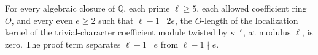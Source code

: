 
\begin{formalstatement}\label{sub:W15}
For every algebraic closure of $\mathbb Q$, each prime $\ell\ge5$,
each allowed coefficient ring $O$, and every even $e\ge2$ such that
$\ell-1\mid2e$, the $O$-length of the localization kernel of the
trivial-character coefficient module twisted by $\kappa^{-e}$, at
modulus $\ell$, is zero. The proof term separates
$\ell-1\mid e$ from $\ell-1\nmid e$.
\end{formalstatement}
